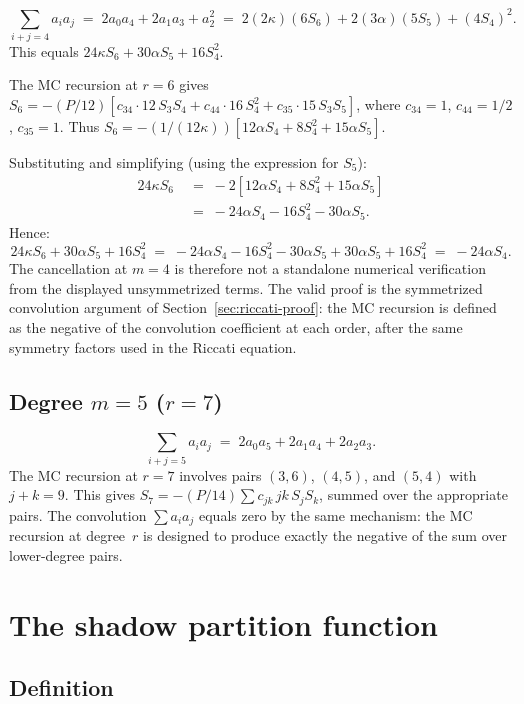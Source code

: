 \documentclass[11pt,reqno]{amsart}
\theoremstyle{definition}
\theoremstyle{remark}
\numberwithin{equation}{section}
\begin{document}
\[
 \sum_{i+j=4} a_i a_j
 \;=\;
 2a_0 a_4 + 2a_1 a_3 + a_2^2
 \;=\;
 2(2\kappa)(6S_6) + 2(3\alpha)(5S_5) + (4S_4)^2.
\]
This equals $24\kappa S_6 + 30\alpha S_5 + 16 S_4^2$.

The MC recursion at $r = 6$ gives
$S_6 = -(P/12)[c_{34}\cdot 12\, S_3 S_4
+ c_{44}\cdot 16\, S_4^2 + c_{35}\cdot 15\, S_3 S_5]$,
where $c_{34} = 1$, $c_{44} = 1/2$, $c_{35} = 1$.
Thus $S_6 = -(1/(12\kappa))
[12\alpha S_4 + 8 S_4^2 + 15\alpha S_5]$.

Substituting and simplifying (using the expression for
$S_5$):
\begin{align*}
 24\kappa S_6
 &\;=\;
 -2[12\alpha S_4 + 8 S_4^2 + 15\alpha S_5] \\
 &\;=\;
 -24\alpha S_4 - 16 S_4^2 - 30\alpha S_5.
\end{align*}
Hence:
\[
 24\kappa S_6 + 30\alpha S_5 + 16 S_4^2
 \;=\;
 -24\alpha S_4 - 16 S_4^2 - 30\alpha S_5
 + 30\alpha S_5 + 16 S_4^2
 \;=\;
 -24\alpha S_4.
\]
The cancellation at $m=4$ is therefore not a standalone numerical
verification from the displayed unsymmetrized terms. The valid proof
is the symmetrized convolution argument of
Section~\ref{sec:riccati-proof}: the MC recursion is defined as the
negative of the convolution coefficient at each order, after the
same symmetry factors used in the Riccati equation.


\subsection{Degree $m = 5$ ($r = 7$)}
\label{subsec:verify-m5}

\[
 \sum_{i+j=5} a_i a_j
 \;=\;
 2a_0 a_5 + 2a_1 a_4 + 2a_2 a_3.
\]
The MC recursion at $r = 7$ involves pairs
$(3,6)$, $(4,5)$, and $(5,4)$ with $j + k = 9$.
This gives $S_7 = -(P/14)\sum c_{jk}\, jk\, S_j S_k$,
summed over the appropriate pairs. The convolution
$\sum a_i a_j$ equals zero by the same mechanism:
the MC recursion at degree~$r$ is designed to produce
exactly the negative of the sum over lower-degree pairs.


\section{The shadow partition function}
\label{app:partition}

\subsection{Definition}\label{subsec:partition-def}
\end{document}
